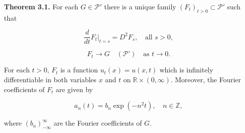 \textbf{Theorem 3.1.} For each $G \in \mathcal{P}'$ there is a unique family $(F_t)_{t > 0} \subset \mathcal{P}'$ such that

$$\frac{d}{dt} F_t \bigg|_{t=s} = D^2 F_s, \quad \text{all } s > 0,$$

$$F_t \rightarrow G \quad (\mathcal{P}') \quad \text{as } t \rightarrow 0.$$

For each $t > 0$, $F_t$ is a function $u_t(x) = u(x, t)$ which is infinitely differentiable in both variables $x$ and $t$ on $\mathbb{R} \times (0, \infty)$. Moreover, the Fourier coefficients of $F_t$ are given by

$$a_n(t) = b_n \exp(-n^2 t), \quad n \in \mathbb{Z},$$

where $(b_n)_{-\infty}^{\infty}$ are the Fourier coefficients of $G$.
